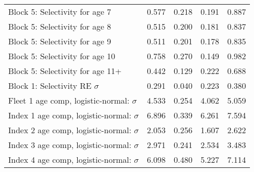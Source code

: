 \documentclass[
]{article}
\begin{document}
\begin{landscape}
\begin{longtable}[t]{lrrrr}
\addlinespace
Block 5: Selectivity for age 7 & 0.577 & 0.218 & 0.191 & 0.887\\
Block 5: Selectivity for age 8 & 0.515 & 0.200 & 0.181 & 0.837\\
Block 5: Selectivity for age 9 & 0.511 & 0.201 & 0.178 & 0.835\\
Block 5: Selectivity for age 10 & 0.758 & 0.270 & 0.149 & 0.982\\
Block 5: Selectivity for age 11+ & 0.442 & 0.129 & 0.222 & 0.688\\
\addlinespace
Block 1: Selectivity RE $\sigma$ & 0.291 & 0.040 & 0.223 & 0.380\\
Fleet 1 age comp, logistic-normal: $\sigma$ & 4.533 & 0.254 & 4.062 & 5.059\\
Index 1 age comp, logistic-normal: $\sigma$ & 6.896 & 0.339 & 6.261 & 7.594\\
Index 2 age comp, logistic-normal: $\sigma$ & 2.053 & 0.256 & 1.607 & 2.622\\
Index 3 age comp, logistic-normal: $\sigma$ & 2.971 & 0.241 & 2.534 & 3.483\\
\addlinespace
Index 4 age comp, logistic-normal: $\sigma$ & 6.098 & 0.480 & 5.227 & 7.114\\*
\end{longtable}
\end{landscape}
\end{document}
